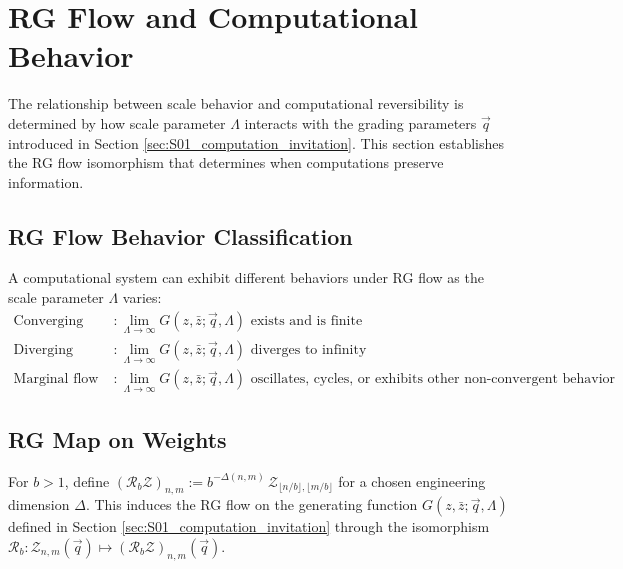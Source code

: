 
\section{RG Flow and Computational Behavior}
\label{sec:rg-flow-behavior}

The relationship between scale behavior and computational reversibility is determined by how scale parameter $\Lambda$ interacts with the grading parameters $\vec{q}$ introduced in Section \ref{sec:S01_computation_invitation}. This section establishes the RG flow isomorphism that determines when computations preserve information.

\subsection{RG Flow Behavior Classification}

\begin{definition}
\label{def:rg-flow-classification}
A computational system can exhibit different behaviors under RG flow as the scale parameter $\Lambda$ varies:
\begin{align}
\text{Converging flow} &: \lim_{\Lambda \to \infty} G(z, \bar{z}; \vec{q}, \Lambda) \text{ exists and is finite} \\
\text{Diverging flow} &: \lim_{\Lambda \to \infty} G(z, \bar{z}; \vec{q}, \Lambda) \text{ diverges to infinity} \\
\text{Marginal flow} &: \lim_{\Lambda \to \infty} G(z, \bar{z}; \vec{q}, \Lambda) \text{ oscillates, cycles, or exhibits other non-convergent behavior}
\end{align}
\end{definition}

\subsection{RG Map on Weights}

\begin{definition}
\label{def:rg-map}
For $b>1$, define $(\mathcal{R}_b\mathcal{Z})_{n,m}:=b^{-\Delta(n,m)}\,\mathcal{Z}_{\lfloor n/b\rfloor,\lfloor m/b\rfloor}$ for a chosen engineering dimension $\Delta$. This induces the RG flow on the generating function $G(z, \bar{z}; \vec{q}, \Lambda)$ defined in Section \ref{sec:S01_computation_invitation} through the isomorphism $\mathcal{R}_b: \mathcal{Z}_{n,m}(\vec{q}) \mapsto (\mathcal{R}_b\mathcal{Z})_{n,m}(\vec{q})$.
\end{definition}

